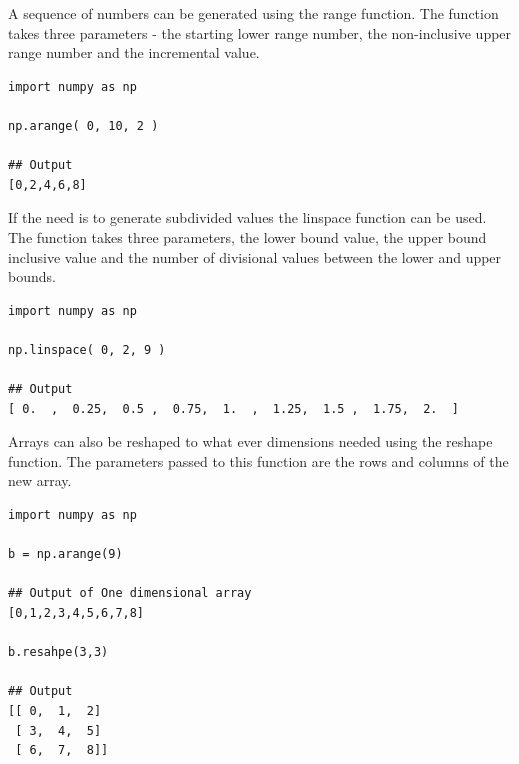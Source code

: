 A sequence of numbers can be generated using  the range function. The function takes three parameters - the starting lower range number, the non-inclusive upper range number and the incremental value.
\begin{verbatim}
import numpy as np

np.arange( 0, 10, 2 )

## Output
[0,2,4,6,8]
\end{verbatim}
If the need is to generate subdivided values the linspace function can be used. The function takes three parameters, the lower bound value, the upper bound inclusive value and the number of divisional values between the lower and upper bounds.
\begin{verbatim}
import numpy as np

np.linspace( 0, 2, 9 ) 

## Output
[ 0.  ,  0.25,  0.5 ,  0.75,  1.  ,  1.25,  1.5 ,  1.75,  2.  ]
\end{verbatim}
Arrays can also be reshaped to what ever dimensions needed using the reshape function. The parameters passed to this function are the rows and columns of the new array.
\begin{verbatim}
import numpy as np

b = np.arange(9)

## Output of One dimensional array
[0,1,2,3,4,5,6,7,8]

b.resahpe(3,3)

## Output
[[ 0,  1,  2]
 [ 3,  4,  5]
 [ 6,  7,  8]]
\end{verbatim}
